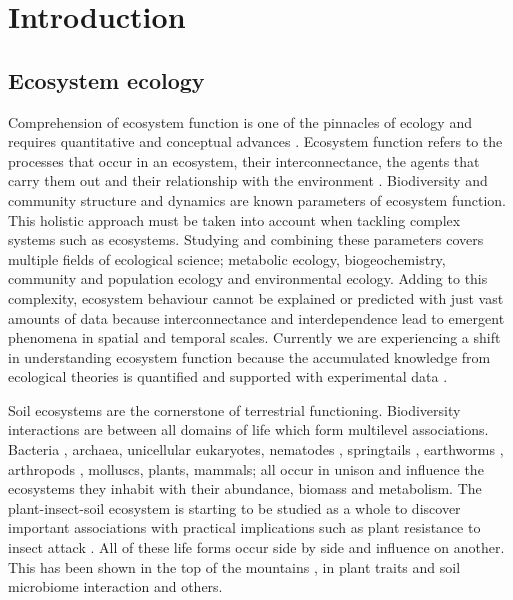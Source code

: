 % 
% 

\chapter{Introduction}
\label{cha:intro}

\section{Ecosystem ecology}
\label{sec:intro-ecosystem}

Comprehension of ecosystem function is one of the pinnacles of ecology and
requires quantitative and conceptual advances \parencite{Chapin_Matson_Vitousek_2011}.
Ecosystem function refers to the processes that occur in an ecosystem, their
interconnectance, the agents that carry them out
and their relationship with the environment \parencite{Chapin_Matson_Vitousek_2011}. Biodiversity
\parencite{hooperEFFECTSBIODIVERSITYECOSYSTEM2005, loreau2001Biodiversity}
and community structure and dynamics \parencite{gonze2018Microbial,morris2020linking}
are known parameters of ecosystem function. This holistic approach must be taken
into account when tackling complex systems such as ecosystems. Studying and
combining these parameters covers multiple fields of ecological science;
metabolic ecology, biogeochemistry, community and population ecology and
environmental ecology. Adding to this complexity, ecosystem behaviour cannot be
explained or predicted with just vast amounts of data because interconnectance
and interdependence lead to emergent phenomena in spatial and temporal scales.
Currently we are experiencing a shift in understanding ecosystem function
because the accumulated knowledge from ecological theories is quantified and
supported with experimental data \parencite{mouquet_review_2015}.

Soil ecosystems are the cornerstone of terrestrial functioning.
Biodiversity interactions are between all domains of life which form
multilevel associations. Bacteria \parencite{Delgado-Baquerizo-atlas}, archaea,
unicellular eukaryotes, nematodes \parencite{vandenHoogen2019},
springtails \parencite{potapov2023Globally}, earthworms \parencite{Phillips2021},
arthropods \parencite{milo-arthropods}, molluscs, plants, mammals; all occur in unison and 
influence the ecosystems they inhabit with their abundance, biomass \parencite{bar2018biomass} and metabolism.
The plant-insect-soil ecosystem is starting to be studied as a whole to discover
important associations with practical implications such as plant resistance 
to insect attack \parencite{plant-insect-soil2023}.
All of these life forms occur side by side and influence on another. This has been shown in the 
top of the mountains \parencite{winkler2018side}, in plant traits and soil microbiome interaction \parencite{beugnon2022Abiotic} and others. 

